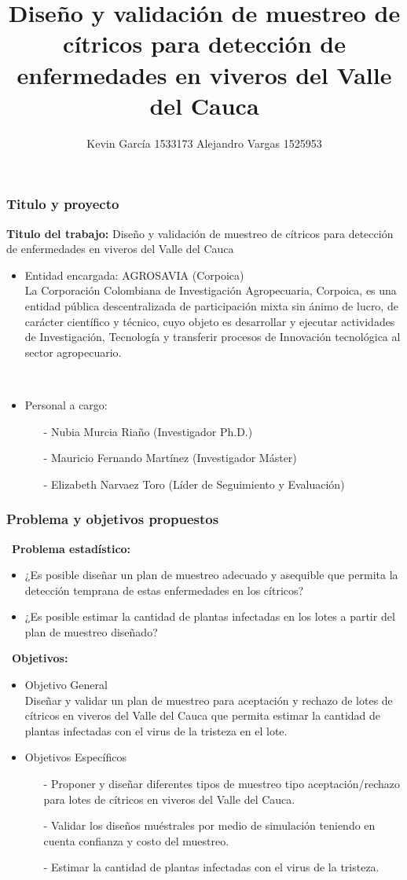 \documentclass[11pt]{beamer}
\author[Kevin García - Alejandro Vargas]{Kevin García 1533173 \newline Alejandro Vargas 1525953}
\title[Anteproyecto]{Diseño y validación de muestreo de cítricos para detección de enfermedades en viveros del Valle del Cauca}
\begin{document}
\justify
\begin{frame}
\frametitle{Titulo y proyecto}
\textbf{Titulo del trabajo:} Diseño y validación de muestreo de cítricos para detección de enfermedades en viveros del Valle del Cauca
\begin{itemize}
\justifying
\item Entidad encargada: AGROSAVIA (Corpoica)
~\\La Corporación Colombiana de Investigación Agropecuaria, Corpoica, es una entidad pública descentralizada de participación mixta sin ánimo de lucro, de carácter científico y técnico, cuyo objeto es desarrollar y ejecutar actividades de Investigación, Tecnología y transferir procesos de Innovación tecnológica al sector agropecuario.

~\\
\item Personal a cargo:
\begin{itemize}
\item[-]Nubia Murcia Riaño (Investigador Ph.D.)
\item[-]Mauricio Fernando Martínez (Investigador Máster)
\item[-]Elizabeth Narvaez Toro (Líder de Seguimiento y Evaluación)
\end{itemize}
\end{itemize}
\end{frame}

\begin{frame}
\frametitle{Problema y objetivos propuestos}
~\textbf{Problema estadístico:}
\begin{itemize}
\justifying
\item ¿Es posible diseñar un plan de muestreo adecuado y asequible que permita la detección temprana de estas enfermedades en los cítricos?
\item ¿Es posible estimar la cantidad de plantas infectadas en los lotes a partir del plan de muestreo diseñado?
\end{itemize}
~\textbf{Objetivos:}
\begin{itemize}
\justifying
\item Objetivo General
~\\Diseñar y validar un plan de muestreo para aceptación y rechazo de lotes de cítricos en viveros del Valle del Cauca que permita estimar la cantidad de plantas infectadas con el virus de la tristeza en el lote.
\item Objetivos Específicos
\begin{itemize}
\item[-]Proponer y diseñar diferentes tipos de muestreo tipo aceptación/rechazo para lotes de cítricos en viveros del Valle del Cauca.
\item[-]Validar los diseños muéstrales por medio de simulación teniendo en cuenta confianza y costo del muestreo.
\item[-]Estimar la cantidad de plantas infectadas con el virus de la tristeza.
\end{itemize}
\end{itemize}
\end{frame}
\end{document}
